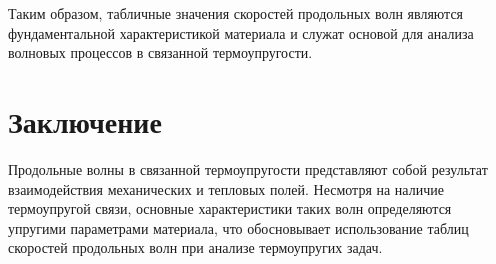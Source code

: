 \documentclass[12pt]{article}
\begin{document}
Таким образом,
табличные значения скоростей продольных волн
являются фундаментальной характеристикой материала
и служат основой для анализа
волновых процессов в связанной термоупругости.

\section{Заключение}

Продольные волны в связанной термоупругости
представляют собой результат взаимодействия
механических и тепловых полей.
Несмотря на наличие термоупругой связи,
основные характеристики таких волн
определяются упругими параметрами материала,
что обосновывает использование
таблиц скоростей продольных волн
при анализе термоупругих задач.
\end{document}
